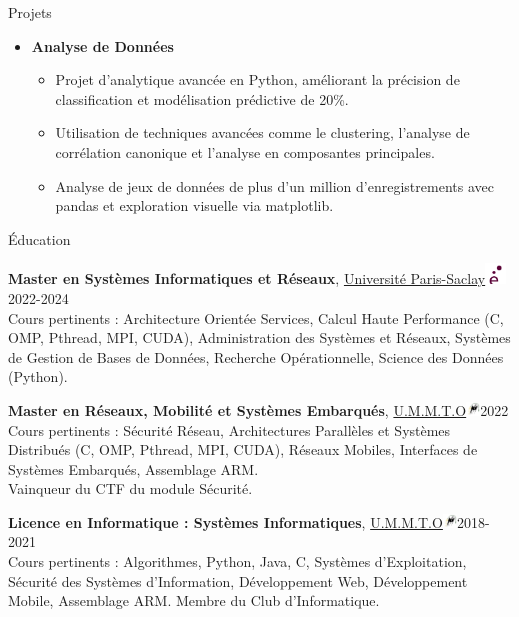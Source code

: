 \documentclass{resume}
\begin{document}
\begin{rSection}{Projets}
\begin{itemize}[leftmargin=*,label= ]
        \item \textbf{\large Analyse de Données}
        \begin{itemize}
            \setlength{\itemsep}{-6pt} %
            \item Projet d'analytique avancée en Python, améliorant la précision de classification et modélisation prédictive de 20\%.
            \item Utilisation de techniques avancées comme le clustering, l'analyse de corrélation canonique et l'analyse en composantes principales.
            \item Analyse de jeux de données de plus d'un million d'enregistrements avec pandas et exploration visuelle via matplotlib.
        \end{itemize}
        
    \end{itemize}
    \end{rSection} 
    \vspace{-0.75em}
    \begin{rSection}{Éducation}
    
        {\large \bf Master en Systèmes Informatiques et Réseaux},  \href{https://www.universite-paris-saclay.fr/}{Université Paris-Saclay\includegraphics[height=1.5em]{../Ressource/petitlogo.png}} \hfill {2022-2024}\\
        Cours pertinents : Architecture Orientée Services, Calcul Haute Performance (C, OMP, Pthread, MPI, CUDA), Administration des Systèmes et Réseaux, Systèmes de Gestion de Bases de Données, Recherche Opérationnelle, Science des Données (Python).
        
        {\large \bf Master en Réseaux, Mobilité et Systèmes Embarqués}, \href{https://www.ummto.dz/}{U.M.M.T.O\includegraphics[height=1em]{../Ressource/ummto.png}}\hfill {2022}\\
        Cours pertinents : Sécurité Réseau, Architectures Parallèles et Systèmes Distribués (C, OMP, Pthread, MPI, CUDA), Réseaux Mobiles, Interfaces de Systèmes Embarqués, Assemblage ARM.\\
        Vainqueur du CTF du module Sécurité.
        
        {\large \bf Licence en Informatique : Systèmes Informatiques}, \href{https://www.ummto.dz/}{U.M.M.T.O\includegraphics[height=1em]{../Ressource/ummto.png}}\hfill {2018-2021}\\
        Cours pertinents : Algorithmes, Python, Java, C, Systèmes d'Exploitation, Sécurité des Systèmes d'Information, Développement Web, Développement Mobile, Assemblage ARM.
        Membre du Club d'Informatique.
    \end{rSection}
    \vspace{-0.75em}
    
\end{document}
